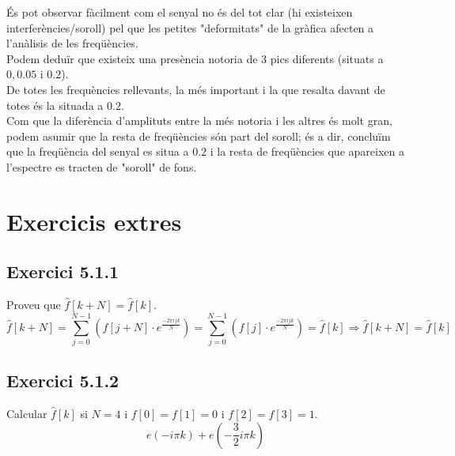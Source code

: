 \documentclass[a4paper, 11pt]{article}
\begin{document}
És pot observar fàcilment com el senyal no és del tot clar (hi existeixen interferències/soroll) pel que les petites "deformitats" \hspace{0.0625 em} de la gràfica afecten a l'anàlisis de les freqüències.\\
Podem deduïr que existeix una presència notoria de 3 pics diferents (situats a $0, 0.05$ i $0.2$).\\
De totes les frequències rellevants, la més important i la que resalta davant de totes és la situada a $0.2$.\\
Com que la diferència d'amplituts entre la més notoria i les altres és molt gran, podem asumir que la resta de freqüències són part del soroll; és a dir, concluïm que la freqüència del senyal es situa a $0.2$ i la resta de freqüències que apareixen a l'espectre es tracten de "soroll"\hspace{0.0625 em} de fons.
\newpage
\section{Exercicis extres}\label{extra}
\subsection{Exercici 5.1.1}
Proveu que $\hat{f}[k+N] = \hat{f}[k]$.\\
$$ \hat{f}[k+N] = \sum_{j = 0}^{N-1} \left( f[j+N]\cdot e^{\frac{−2\pi i j k}{N}}\right) = \sum_{j = 0}^{N-1} \left( f[j]\cdot e^{\frac{−2\pi i j k}{N}}\right) = \hat{f}[k] \Longrightarrow \hat{f}[k+N] = \hat{f}[k]$$
\subsection{Exercici 5.1.2}
Calcular $\hat{f}[k]$ si $N=4$ i $f[0]=f[1]=0$ i $f[2]=f[3]=1$.\\
$$e(-i\pi k) + e(-\frac{3}{2}i\pi k)$$
\end{document}
